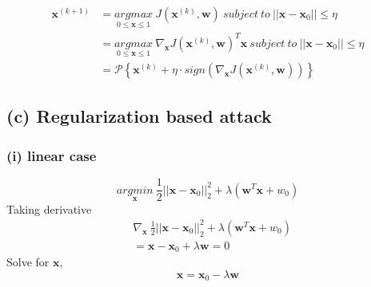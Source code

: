 \documentclass[11pt]{article}
\begin{document}
\begin{equation}
\begin{split}
\pmb{x}^{(k+1)}&=\underset{0\le \pmb{x}\le 1}{argmax}\ J(\pmb{x}^{(k)},\pmb{w})\ subject\ to\ ||\pmb{x}-\pmb{x}_0||\le\eta\\
&=\underset{0\le \pmb{x}\le 1}{argmax}\ \nabla_{\pmb{x}}J(\pmb{x}^{(k)},\pmb{w})^T\pmb{x}\ subject\ to\ ||\pmb{x}-\pmb{x}_0||\le\eta\\
&=\mathcal{P}\left\{\pmb{x}^{(k)}+\eta\cdot sign\left(\nabla_{\pmb{x}}J(\pmb{x}^{(k)},\pmb{w})\right)\right\}
\end{split}
\end{equation}

\subsection*{(c) Regularization based attack}
\subsubsection*{(i) linear case}
\begin{equation}
\underset{\pmb{x}}{argmin}\ \frac{1}{2}||\pmb{x}-\pmb{x}_0||^2_2+\lambda(\pmb{w}^T\pmb{x}+w_0)
\end{equation}
Taking derivative
\begin{equation}
\begin{split}
&\nabla_{\pmb{x}}\ \frac{1}{2}||\pmb{x}-\pmb{x}_0||^2_2+\lambda(\pmb{w}^T\pmb{x}+w_0)\\
&=\pmb{x}-\pmb{x}_0+\lambda\pmb{w} = 0
\end{split}
\end{equation}
Solve for $\pmb{x}$,
\begin{equation}
\pmb{x} = \pmb{x}_0-\lambda\pmb{w}
\end{equation}
\end{document}
